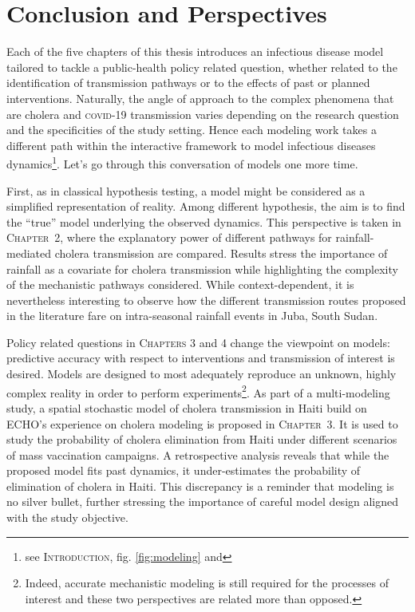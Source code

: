 \chapter*{Conclusion and Perspectives}
Each of the five chapters of this thesis introduces an infectious disease model tailored to tackle a public-health policy related question, whether related to the identification of transmission pathways or to the effects of past or planned interventions. Naturally, the angle of approach to the complex phenomena that are cholera and \textsc{covid}-19 transmission varies depending on the research question and the specificities of the study setting. Hence each modeling work takes a different path within the interactive framework to model infectious diseases dynamics\footnote{see \textsc{Introduction}, fig. \ref{fig:modeling} and }.  Let's go through this conversation of models one more time.


First, as in classical hypothesis testing, a model might be considered as a simplified representation of reality. Among different hypothesis, the aim is to find the ``true'' model underlying the observed dynamics. This perspective is taken in \textsc{Chapter~2}, where the explanatory power of different pathways for rainfall-mediated cholera transmission are compared\cite{Rinaldo:Reassessment20102011:2012, Eisenberg:ExaminingRainfallCholera:2013}. Results stress the importance of rainfall as a covariate for cholera transmission while highlighting the complexity of the mechanistic pathways considered. While context-dependent, it is nevertheless interesting to observe how the different transmission routes proposed in the literature fare on intra-seasonal rainfall events in Juba, South Sudan.

Policy related questions in \textsc{Chapters 3} and 4 change the viewpoint on models: predictive accuracy with respect to interventions and transmission of interest is desired. Models are designed to most adequately reproduce an unknown, highly complex reality in order to perform experiments\footnote{Indeed, accurate mechanistic modeling is still required for the processes of interest and these two perspectives are related more than opposed.}. As part of a multi-modeling study\cite{Lee:AchievingCoordinatedNational:2020}, a spatial stochastic model of cholera transmission in Haiti build on ECHO's experience on cholera modeling\cite{Rinaldo:RiverNetworksEcological:2020a} is proposed in \textsc{Chapter~3}. It is used to study the probability of cholera elimination from Haiti under different scenarios of mass vaccination campaigns. A retrospective analysis reveals that while the proposed model fits past dynamics, it under-estimates the probability of elimination of cholera in Haiti. This discrepancy  is a reminder that modeling is no silver bullet, further stressing the importance of careful model design aligned with the study objective. 

